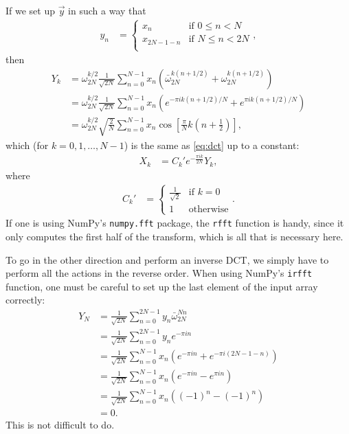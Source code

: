 If we set up $\vec{y}$ in such a way that
\begin{align}
	y_n
	&= \begin{cases}
			x_n & \text{if } 0 \le n < N \\
			x_{2 N - 1 - n} & \text{if } N \le n < 2 N \\
		\end{cases},
\end{align}
then
\begin{subequations}
\begin{align}
	Y_k
	&= \omega_{2 N}^{k/2} \frac{1}{\sqrt{2 N}} \sum_{n=0}^{N - 1} x_n (\bar{\omega}_{2 N}^{k (n + 1/2)} + \omega_{2 N}^{k (n + 1/2)}) \\
	&= \omega_{2 N}^{k/2} \frac{1}{\sqrt{2 N}} \sum_{n=0}^{N - 1} x_n (e^{-\pi i k (n + 1/2) / N} + e^{\pi i k (n + 1/2) / N}) \\
	&= \omega_{2 N}^{k/2} \sqrt{\frac{2}{N}} \sum_{n=0}^{N - 1} x_n \cos{\left[ \frac{\pi}{N} k \left( n + \frac{1}{2} \right) \right]},
\end{align}
\end{subequations}
which (for $k = 0, 1, \ldots, N - 1$) is the same as \cref{eq:dct} up to a constant:
\begin{align}
	X_k
	&= C_k' e^{-\frac{\pi i k}{2 N}} Y_k,
\end{align}
where
\begin{align}
	C_k'
	&= \begin{cases}
			\frac{1}{\sqrt{2}} & \text{if } k = 0 \\
			1 & \text{otherwise}
		\end{cases}.
\end{align}
If one is using NumPy's \texttt{numpy.fft} package, the \texttt{rfft} function is handy, since it only computes the first half of the transform, which is all that is necessary here.

To go in the other direction and perform an inverse DCT, we simply have to perform all the actions in the reverse order.
When using NumPy's \texttt{irfft} function, one must be careful to set up the last element of the input array correctly:
\begin{subequations}
\begin{align}
	Y_N
	&= \frac{1}{\sqrt{2 N}} \sum_{n=0}^{2 N - 1} y_n \bar{\omega}_{2 N}^{N n} \\
	&= \frac{1}{\sqrt{2 N}} \sum_{n=0}^{2 N - 1} y_n e^{-\pi i n} \\
	&= \frac{1}{\sqrt{2 N}} \sum_{n=0}^{N - 1} x_n (e^{-\pi i n} + e^{-\pi i (2 N - 1 - n)}) \\
	&= \frac{1}{\sqrt{2 N}} \sum_{n=0}^{N - 1} x_n (e^{-\pi i n} - e^{\pi i n}) \\
	&= \frac{1}{\sqrt{2 N}} \sum_{n=0}^{N - 1} x_n ((-1)^n - (-1)^n) \\
	&= 0.
\end{align}
\end{subequations}
This is not difficult to do.
